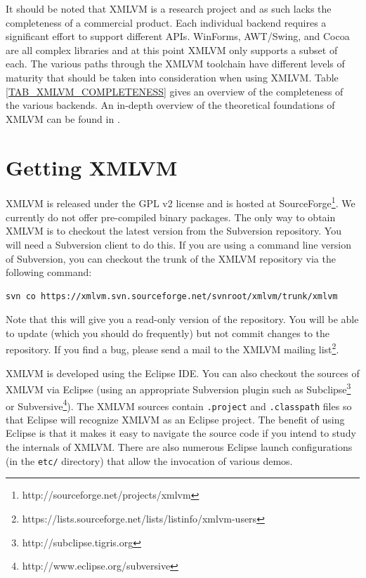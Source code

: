 \documentclass[11pt]{book}
\begin{document}
It should be noted that XMLVM is a research project and as such lacks
the completeness of a commercial product. Each individual backend
requires a significant effort to support different APIs. WinForms,
AWT/Swing, and Cocoa are all complex libraries and at this point XMLVM
only supports a subset of each. The various paths through the XMLVM
toolchain have different levels of maturity that should be taken
into consideration when using XMLVM. Table
\ref{TAB_XMLVM_COMPLETENESS} gives an overview of the completeness of
the various backends. An in-depth overview of the theoretical
foundations of XMLVM can be found in \cite{Puder:09a}.



\section{Getting XMLVM}
\label{SEC_GETTING_XMLVM}

XMLVM is released under the GPL v2 license and is hosted at
SourceForge\footnote{http://sourceforge.net/projects/xmlvm}.
We currently do not offer pre-compiled binary packages.
The only way to obtain XMLVM is to checkout the latest version from
the Subversion repository. You will need a Subversion client to do
this. If you are using a command line version of Subversion, you can
checkout the trunk of the XMLVM repository via the following command:

\begin{verbatim}
svn co https://xmlvm.svn.sourceforge.net/svnroot/xmlvm/trunk/xmlvm
\end{verbatim}

Note that this will give you a read-only version of the repository.
You will be able to update (which you should do frequently) but not
commit changes to the repository. If you find a bug, please send a
mail to the XMLVM mailing list\footnote{https://lists.sourceforge.net/lists/listinfo/xmlvm-users}.

XMLVM is developed using the Eclipse IDE. You can also checkout the
sources of XMLVM via Eclipse (using an appropriate Subversion plugin
such as Subclipse\footnote{http://subclipse.tigris.org} or
Subversive\footnote{http://www.eclipse.org/subversive}). The XMLVM sources contain
\texttt{.project} and \texttt{.classpath} files so that Eclipse will
recognize XMLVM as an Eclipse project. The benefit of using Eclipse is
that it makes it easy to navigate the source code if you intend to
study the internals of XMLVM. There are also numerous Eclipse launch
configurations (in the \texttt{etc/} directory) that allow the
invocation of various demos.
\end{document}
